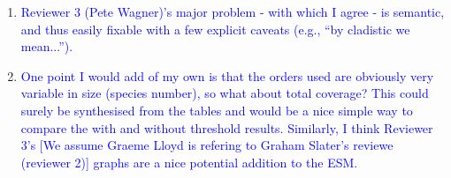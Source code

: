 \documentclass[12pt,letterpaper]{article}
\begin{document}
\begin{enumerate}
\item{\textcolor{blue}{Reviewer 3 (Pete Wagner)’s major problem - with which I agree - is semantic, and thus easily fixable with a few explicit caveats (e.g., ``by cladistic we mean...'').}}

\item{\textcolor{blue}{One point I would add of my own is that the orders used are obviously very variable in size (species number), so what about total coverage?
This could surely be synthesised from the tables and would be a nice simple way to compare the with and without threshold results.
Similarly, I think Reviewer 3’s [We assume Graeme Lloyd is refering to Graham Slater's reviewe (reviewer 2)] %
 graphs are a nice potential addition to the ESM.}}
\end{enumerate}
\end{document}
